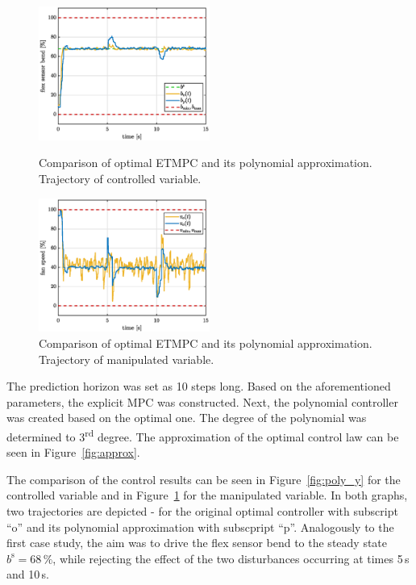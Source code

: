 \documentclass[letterpaper, 10 pt, conference]{ieeeconf}
\begin{document}
\begin{figure}[bp!]
	\begin{center}
		\includegraphics[width=0.5\textwidth]{images/poly_b.eps}
		\caption{Comparison of optimal ETMPC and its polynomial approximation. Trajectory of controlled variable.}
		\label{fig:poly_y}
	\end{center}
	\begin{center}
		\includegraphics[width=0.5\textwidth]{images/poly_v.eps}
		\caption{Comparison of optimal ETMPC and its polynomial approximation. Trajectory of manipulated variable.}
		\label{fig:poly_u}
	\end{center}
\end{figure}

The prediction horizon was set as 10 steps long. Based on the aforementioned parameters, the explicit MPC was constructed. Next, the polynomial controller was created based on the optimal one. The degree of the polynomial was determined to 3\textsuperscript{rd} degree. The approximation of the optimal control law can be seen in Figure~\ref{fig:approx}.

The comparison of the control results can be seen in Figure~\ref{fig:poly_y} for the controlled variable and in Figure~\ref{fig:poly_u} for the manipulated variable. In both graphs, two trajectories are depicted - for the original optimal controller with subscript ``o'' and its polynomial approximation with subscpript ``p''. Analogously to the first case study, the aim was to drive the flex sensor bend to the steady state $ b^\mathrm{s} = 68\,\%$, while rejecting the effect of the two disturbances occurring at times 5\,s and 10\,s.
\end{document}
